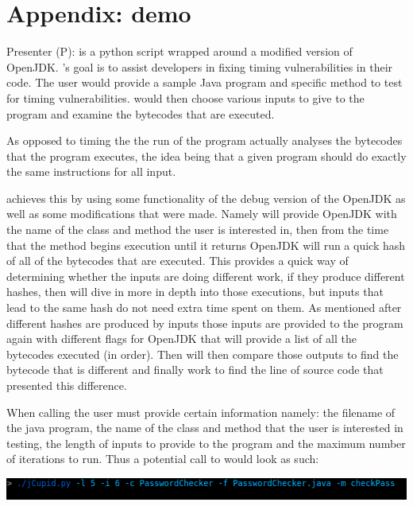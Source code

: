 
\section{Appendix: \jcupid demo}

Presenter (P): \jcupid is a python script wrapped around a modified version of OpenJDK. \jcupid's goal
is to assist developers in fixing timing vulnerabilities in their code. The user would provide a sample
Java program and specific method to test for timing vulnerabilities. \jcupid would then choose various
inputs to give to the program and examine the bytecodes that are executed.

As opposed to timing the the run of the program \jcupid actually analyses the bytecodes that the program
executes, the idea being that a given program should do exactly the same instructions for all input.

\jcupid achieves this by using some functionality of the debug version of the OpenJDK as well as some
modifications that were made. Namely \jcupid will provide OpenJDK with the name of the class and method
the user is interested in, then from the time that the method begins execution until it returns OpenJDK
will run a quick hash of all of the bytecodes that are executed. This provides a quick way of determining
whether the inputs are doing different work, if they produce different hashes, then \jcupid will dive 
in more in depth into those executions, but inputs that lead to the same hash do not need extra time
spent on them. As mentioned after different hashes are produced by inputs those inputs are provided
to the program again with different flags for OpenJDK that will provide a list of all the bytecodes 
executed (in order). Then \jcupid will then compare those outputs to find the bytecode that is different
and finally work to find the line of source code that presented this difference.

When calling \jcupid the user must provide certain information namely: the filename of the java program,
the name of the class and method that the user is interested in testing, the length of inputs to provide
to the program and the maximum number of iterations to run. Thus a potential call to \jcupid would look
as such:

\begin{center}
  \includegraphics[width=\linewidth]{jCupidCall}
\end{center}

